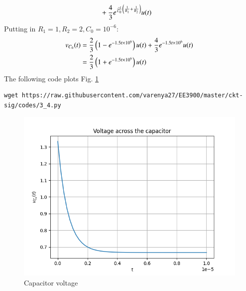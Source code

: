 \documentclass[journal,12pt,twocolumn]{IEEEtran}
\renewcommand\thesection{\arabic{section}}
\begin{document}
\begin{enumerate}[label=\arabic*.,ref=\thesection.\theenumi]
\begin{align}
    &+\frac{4}{3}e^{\frac{-t}{C_0}\left(\frac{1}{R_1}+\frac{1}{R_2}\right)}u(t)
\end{align}
Putting in $R_1=1, R_2=2, C_0=10^{-6}$:
\begin{align}
        v_{C_0}(t) &= \frac{2}{3}\left(1-e^{-1.5t\times10^6}\right)u(t)+    \frac{4}{3}e^{-1.5t\times10^6}u(t)\\
    &=\frac{2}{3}\left(1+e^{-1.5t\times10^6}\right)u(t)\label{eq:vct2}
\end{align}
The following code plots Fig. \ref{fig:vct2}
	\begin{lstlisting}
wget https://raw.githubusercontent.com/varenya27/EE3900/master/ckt-sig/codes/3_4.py
\end{lstlisting}
	\begin{figure}[h!]
	    \centering
	    \includegraphics[width=\columnwidth]{figs/vct2.png}
	    \caption{Capacitor voltage }
	    \label{fig:vct2}
	\end{figure}


\end{enumerate}
\end{document}

